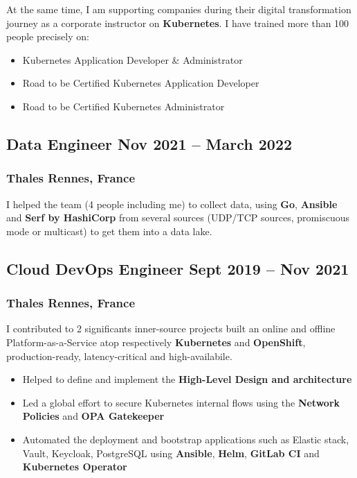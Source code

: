 \documentclass[11pt]{article}
\newcommand{\rside}[1]{
  \hfill {\normalfont\color{gray} #1}%
}
\begin{document}
\begin{justify}
  At the same time, I am supporting companies during their digital transformation journey as a corporate instructor on \textbf{Kubernetes}. I have trained more than 100 people precisely on:
  
  \begin{itemize}
    \item Kubernetes Application Developer \& Administrator
    \item Road to be Certified Kubernetes Application Developer
    \item Road to be Certified Kubernetes Administrator
  \end{itemize}
\end{justify}

\subsection{Data Engineer \rside{Nov 2021 -- March 2022}}
\subsubsection{Thales \rside{Rennes, France}}

\begin{justify}
  I helped the team (4 people including me) to collect data, using \textbf{Go}, \textbf{Ansible} and \textbf{Serf by HashiCorp} from several sources (UDP/TCP sources, promiscuous mode or multicast) to get them into a data lake.
\end{justify}
\vspace{-2mm}

\subsection{Cloud DevOps Engineer \rside{Sept 2019 -- Nov 2021}}
\subsubsection{Thales \rside{Rennes, France}}

\begin{justify}
  I contributed to 2 significants inner-source projects built an online and offline Platform-as-a-Service atop respectively \textbf{Kubernetes} and \textbf{OpenShift}, production-ready, latency-critical and high-availabile.
\end{justify}
\vspace{-2mm}

\begin{itemize}
  \item Helped to define and implement the \textbf{High-Level Design and architecture}
  \item Led a global effort to secure Kubernetes internal flows using the \textbf{Network Policies} and \textbf{OPA Gatekeeper}
  \item Automated the deployment and bootstrap applications such as Elastic stack, Vault, Keycloak, PostgreSQL using \textbf{Ansible}, \textbf{Helm}, \textbf{GitLab CI} and \textbf{Kubernetes Operator}
\end{itemize}
\end{document}
